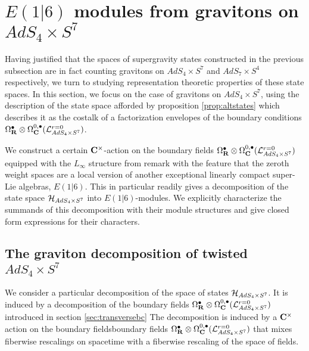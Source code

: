 \documentclass[../main.tex]{subfiles}
\begin{document}
 

\section{$E(1|6)$ modules from gravitons on $AdS_4\times S^7$}\label{sec:e16}

Having justified that the spaces of supergravity states constructed in the previous subsection are in fact counting gravitons on $AdS_4\times S^7$ and $AdS_7\times S^4$ respectively, we turn to studying representation theoretic properties of these state spaces. In this section, we focus on the case of gravitons on $AdS_4\times S^7$, using the description of the state space afforded by proposition \ref{prop:altstates} which describes it as the costalk of a factorization envelopes of the boundary conditions $\Omega^\bullet _{\mathbf{R}}\otimes \Omega^{0,\bullet}_{\mathbf{C}} (\mathcal{L}^{{r=0}}_{AdS_4\times S^7} )$.

We construct a certain $\mathbf{C}^\times$-action on the boundary fields $\Omega^\bullet _{\mathbf{R}}\otimes \Omega^{0,\bullet}_{\mathbf{C}} (\mathcal{L}^{{r=0}}_{AdS_4\times S^7} )$ equipped with the $L_\infty$ structure from remark \label{rmk:nottransferred} with the feature that the zeroth weight spaces are a local version of another exceptional linearly compact super-Lie algebras, $E(1|6)$. This in particular readily gives a decomposition of the state space $\mathcal{H}_{AdS_4\times S^7}$ into $E(1|6)$-modules. We explicitly characterize the summands of this decomposition with their module structures and give closed form expressions for their characters.

\subsection{The graviton decomposition of twisted $AdS_4\times S^7$}
\parsec{}
We consider a particular decomposition of the space of states $\mathcal{H}_{AdS_4\times S^7}$. It is induced by a decomposition of the boundary fields $\Omega^\bullet_{\mathbf{R}}\otimes \Omega^{0,\bullet}_{\mathbf{C}} (\mathcal{L}^{{r=0}}_{AdS_4\times S^7} )$ introduced in section \ref{sec:transversebc}  The decomposition is induced by a $\mathbf{C}^\times$ action on the boundary fieldsboundary fields $\Omega^\bullet_{\mathbf{R}} \otimes \Omega^{0,\bullet}_{\mathbf{C}} (\mathcal{L}^{{r=0}}_{AdS_4\times S^7} )$ that mixes fiberwise rescalings on spacetime with a fiberwise rescaling of the space of fields. 
\end{document}
